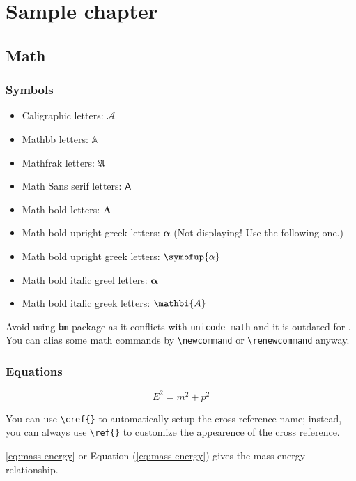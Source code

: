 \chapter{Sample chapter}\label{chap:sample}

\section{Math}

\subsection{Symbols}

\begin{itemize}
  \item Caligraphic letters: $\mathcal{A}$ 
  \item Mathbb letters: $\mathbb{A}$
  \item Mathfrak letters: $\mathfrak{A}$
  \item Math Sans serif letters: $\mathsf{A}$
  \item Math bold letters: $\mathbf{A}$
  \item Math bold upright greek letters: $\mathbf{\alpha}$ (Not displaying! Use the following one.)
  \item Math bold upright greek letters: $\symbfup{\alpha}$
  \item Math bold italic greel letters: $\bm{\alpha}$
  \item Math bold italic greek letters: $\mathbi{A}$
\end{itemize}

Avoid using \lstinline|bm| package as it conflicts with \lstinline|unicode-math| and it is outdated for .
You can alias some math commands by \lstinline|\newcommand| or \lstinline|\renewcommand| anyway.

\subsection{Equations}

\begin{equation}
  E^2 = m^2 + p^2\label{eq:mass-energy}
\end{equation}

You can use \lstinline|\cref{}| to automatically setup the cross reference name; instead, you can always use \lstinline|\ref{}| to customize the appearence of the cross reference.

\cref{eq:mass-energy} or Equation (\ref{eq:mass-energy}) gives the mass-energy relationship.

